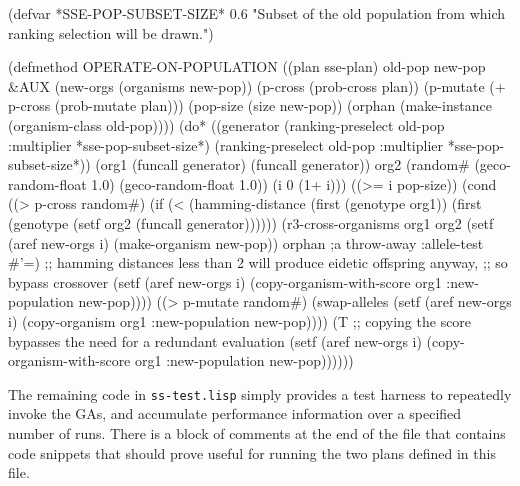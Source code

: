 \filbreak
\begin{clcode}(defvar *SSE-POP-SUBSET-SIZE* 0.6
  {\sf "Subset of the old population from which ranking selection will be drawn."})

(defmethod OPERATE-ON-POPULATION ((plan sse-plan) old-pop new-pop &AUX
                                  (new-orgs (organisms new-pop))
                                  (p-cross (prob-cross plan))
                                  (p-mutate (+ p-cross (prob-mutate plan)))
                                  (pop-size (size new-pop))
                                  (orphan (make-instance
                                           (organism-class old-pop))))
  (do* ((generator (ranking-preselect old-pop
                                      :multiplier *sse-pop-subset-size*)
                   (ranking-preselect old-pop
                                      :multiplier *sse-pop-subset-size*))
        (org1 (funcall generator)
              (funcall generator))
        org2
        (random# (geco-random-float 1.0) (geco-random-float 1.0))
        (i 0 (1+ i)))
       ((>= i pop-size))
    (cond
     ((> p-cross random#)
      (if (< (hamming-distance
              (first (genotype org1))
              (first (genotype (setf org2 (funcall generator))))))
          (r3-cross-organisms
           org1 org2
           (setf (aref new-orgs i) (make-organism new-pop))
           orphan ;a throw-away
           :allele-test #'=)
        ;; {\sf hamming distances less than 2 will produce eidetic offspring anyway,}
        ;; {\sf so bypass crossover}
        (setf (aref new-orgs i)
              (copy-organism-with-score org1 :new-population new-pop))))
     ((> p-mutate random#)
      (swap-alleles (setf (aref new-orgs i)
                          (copy-organism org1 :new-population new-pop))))
     (T ;; {\sf copying the score bypasses the need for a redundant evaluation}
      (setf (aref new-orgs i)
            (copy-organism-with-score org1 :new-population new-pop))))))\end{clcode}
\filbreak

The remaining code in \verb|ss-test.lisp| simply provides a test harness 
to repeatedly invoke the GAs, and accumulate performance information over 
a specified number of runs.
There is a block of comments at the end of the file that contains code
snippets that should prove useful for running the two plans defined in this file.

